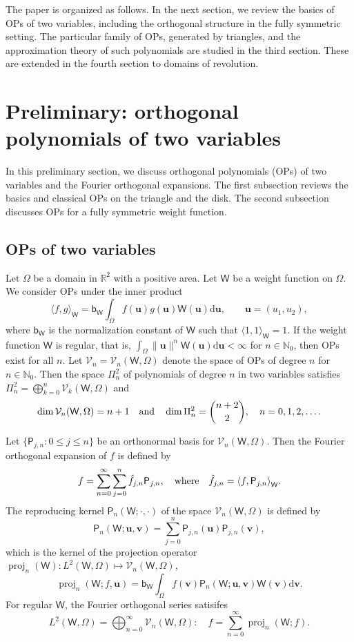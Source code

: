 \documentclass{amsart}
\theoremstyle{remark}
\def\la{{\langle}}
\def\ra{{\rangle}}
\def\d{\mathrm{d}}
\def\sb{{\mathsf b}}
\def\sP{{\mathsf P}}
\def\sW{{\mathsf W}}
\def\la{{\langle}}
\def\ra{{\rangle}}
\def\ub{{\mathbf u}}
\def\vb{{\mathbf v}}
\def\CV{{\mathcal V}}
\def\NN{{\mathbb N}}
\def\RR{{\mathbb R}}
\def\proj{\operatorname{proj}}
\begin{document}
The paper is organized as follows. In the next section, we review the basics of OPs of two
variables, including the orthogonal structure in the fully symmetric setting. The particular family of OPs, 
generated by triangles, and the approximation theory of such polynomials are studied in the third section. 
These are extended in the fourth section to domains of revolution. 

\section{Preliminary: orthogonal polynomials of two variables}
\setcounter{equation}{0}

In this preliminary section, we discuss orthogonal polynomials (OPs) of two variables and the Fourier orthogonal
expansions. The first subsection reviews the basics and classical OPs on the triangle and the disk. The second subsection 
discusses OPs for a fully symmetric weight function. 

\subsection{OPs of two variables}
Let $\Omega$ be a domain in $\RR^2$ with a positive area. Let $\sW$ be a weight function on $\Omega$. 
We consider OPs under the inner product 
\begin{equation} \label{eq:ipd-2d}
  \la f, g\ra_\sW = \sb_\sW \int_\Omega f(\ub) g(\ub) \sW(\ub) \d \ub, \qquad \ub = (u_1,u_2), 
\end{equation}
where $\sb_\sW$ is the normalization constant of $\sW$ such that $\la 1, 1 \ra_\sW = 1$. If the weight function
$\sW$ is regular, that is, $\int_\Omega \|\ub\|^n \sW(\ub)\d \ub < \infty$ for $n \in \NN_0$, then OPs exist for 
all $n$. Let $\CV_n = \CV_n(\sW, \Omega)$ denote the space of OPs of degree $n$ for $n \in \NN_0$. Then
the space $\Pi_n^2$ of polynomials of degree $n$ in two variables satisfies 
$\Pi_n^2 = \bigoplus_{k=0}^n \CV_k(\sW, \Omega)$ and 
$$
\dim \CV_n(\sW,\Omega) = n+1 \quad \hbox{and}\quad \dim \Pi_n^2 = \binom{n+2}{2}, \quad n = 0,1, 2, \ldots. 
$$

Let $\{\sP_{j,n}: 0 \le j \le n\}$ be an orthonormal basis for $\CV_n(\sW,\Omega) $. Then the Fourier orthogonal 
expansion of $f$ is defined by 
$$
  f = \sum_{n=0}^\infty \sum_{j=0}^n \hat f_{j,n} \sP_{j,n}, \quad\hbox{where} \quad \hat f_{j,n} = \la f, \sP_{j,n} \ra_{\sW}.  
$$
The reproducing kernel $ \sP_n(\sW; \cdot,\cdot)$ of the space $\CV_n(\sW, \Omega)$ is defined by 
\begin{equation} \label{eq:reprod_2d}
    \sP_n(\sW; \ub, \vb) = \sum_{j=0}^n \sP_{j,n} (\ub) \sP_{j,n} (\vb),
\end{equation}
which is the kernel of the projection operator $\proj_n(\sW): L^2(\sW, \Omega) \mapsto \CV_n(\sW, \Omega)$, 
$$
    \proj_n (\sW; f, \ub) = \sb_\sW \int_\Omega f(\vb) \sP_n(\sW; \ub,\vb) \sW(\vb) \d \vb. 
$$
For regular $\sW$, the Fourier orthogonal series satisifes 
$$
   L^2(\sW, \Omega) = \bigoplus_{n=0}^\infty  \CV_n(\sW, \Omega): \quad f = \sum_{n=0}^\infty \proj_n(\sW; f). 
$$
\end{document}
